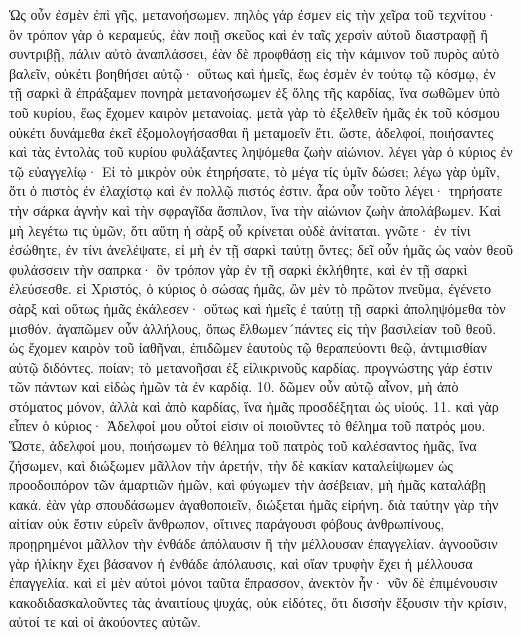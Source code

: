 Ὡς οὖν ἐσμὲν ἐπὶ γῆς, μετανοήσωμεν. πηλὸς γάρ ἐσμεν εἰς τὴν χεῖρα τοῦ τεχνίτου· ὃν τρόπον γὰρ ὁ κεραμεύς, ἐὰν ποιῇ σκεῦος καὶ ἐν ταῖς χερσὶν αὐτοῦ διαστραφῇ ἢ συντριβῇ, πάλιν αὐτὸ ἀναπλάσσει, ἐὰν δὲ προφθάσῃ εἰς τὴν κάμινον τοῦ πυρὸς αὐτὸ βαλεῖν, οὐκέτι βοηθήσει αὐτῷ· οὕτως καὶ ἡμεῖς, ἕως ἐσμὲν ἐν τούτῳ τῷ κόσμῳ, ἐν τῇ σαρκὶ ἃ ἐπράξαμεν πονηρὰ μετανοήσωμεν ἐξ ὅλης τῆς καρδίας, ἵνα σωθῶμεν ὑπὸ τοῦ κυρίου, ἕως ἔχομεν καιρὸν μετανοίας. μετὰ γὰρ τὸ ἐξελθεῖν ἡμᾶς ἐκ τοῦ κόσμου οὐκέτι δυνάμεθα ἐκεῖ ἐξομολογήσασθαι ἢ μεταμοεῖν ἔτι. ὥστε, ἀδελφοί, ποιήσαντες καὶ τὰς ἐντολὰς τοῦ κυρίου φυλάξαντες ληψόμεθα ζωὴν αἰώνιον. λέγει γὰρ ὁ κύριος ἐν τῷ εὐαγγελίῳ· Εἰ τὸ μικρὸν οὐκ ἐτηρήσατε, τὸ μέγα τίς ὑμῖν δώσει; λέγω γὰρ ὑμῖν, ὅτι ὁ πιστὸς ἐν ἐλαχίστῳ καὶ ἐν πολλῷ πιστός ἐστιν. ἆρα οὖν τοῦτο λέγει· τηρήσατε τὴν σάρκα ἁγνὴν καὶ τὴν σφραγῖδα ἄσπιλον, ἵνα τὴν αἰώνιον ζωὴν ἀπολάβωμεν.
Καὶ μὴ λεγέτω τις ὑμῶν, ὅτι αὕτη ἡ σὰρξ οὖ κρίνεται οὐδὲ ἀνίταται. γνῶτε· ἐν τίνι ἐσώθητε, ἐν τίνι ἀνελέψατε, εἰ μὴ ἐν τῇ σαρκὶ ταύτῃ ὄντες; δεῖ οὖν ἡμᾶς ὡς ναὸν θεοῦ φυλάσσειν τὴν σαπρκα· ὃν τρόπον γὰρ ἐν τῇ σαρκὶ ἐκλήθητε, καὶ ἐν τῇ σαρκὶ ἐλεύσεσθε. εἰ Χριστός, ὁ κύριος ὁ σώσας ἡμᾶς, ὢν μὲν τὸ πρῶτον πνεῦμα, ἐγένετο σὰρξ καὶ οὕτως ἡμᾶς ἐκάλεσεν· οὕτως καὶ ἡμεῖς ἐ ταύτῃ τῇ σαρκὶ ἀποληψόμεθα τὸν μισθόν. ἀγαπῶμεν οὖν ἀλλήλους, ὅπως ἔλθωμεν´πάντες εἰς τὴν βασιλείαν τοῦ θεοῦ. ὡς ἔχομεν καιρὸν τοῦ ἰαθῆναι, ἐπιδῶμεν ἑαυτοὺς τῷ θεραπεύοντι θεῷ, ἀντιμισθίαν αὐτῷ διδόντες. ποίαν; τὸ μετανοῆσαι ἐξ εἰλικρινοῦς καρδίας. προγνώστης γάρ ἐστιν τῶν πάντων καὶ εἰδὼς ἡμῶν τὰ ἐν καρδίᾳ. 10. δῶμεν οὖν αὐτῷ αἶνον, μὴ ἀπὸ στόματος μόνον, ἀλλὰ καὶ ἀπὸ καρδίας, ἵνα ἡμᾶς προσδέξηται ὡς υἱούς. 11. καὶ γὰρ εἶπεν ὁ κύριος· Ἀδελφοί μου οὗτοί εἰσιν οἱ ποιοῦντες τὸ θέλημα τοῦ πατρός μου.
Ὥστε, ἀδελφοί μου, ποιήσωμεν τὸ θέλημα τοῦ πατρὸς τοῦ καλέσαντος ἡμᾶς, ἵνα ζήσωμεν, καὶ διώξωμεν μᾶλλον τὴν ἀρετήν, τὴν δὲ κακίαν καταλείψωμεν ὡς προοδοιπόρον τῶν ἁμαρτιῶν ἡμῶν, καὶ φύγωμεν τὴν ἀσέβειαν, μὴ ἡμᾶς καταλάβῃ κακά. ἐὰν γὰρ σπουδάσωμεν ἀγαθοποιεῖν, διώξεται ἡμᾶς εἰρήνη. διὰ ταύτην γὰρ τὴν αἰτίαν οὐκ ἔστιν εὑρεῖν ἄνθρωπον, οἵτινες παράγουσι φόβους ἀνθρωπίνους, προῃρημένοι μᾶλλον τὴν ἐνθάδε ἀπόλαυσιν ἢ τὴν μέλλουσαν ἐπαγγελίαν. ἀγνοοῦσιν γὰρ ἡλίκην ἔχει βάσανον ἡ ἐνθάδε ἀπόλαυσις, καὶ οἵαν τρυφὴν ἔχει ἡ μέλλουσα ἐπαγγελία. καὶ εἰ μὲν αὐτοὶ μόνοι ταῦτα ἔπρασσον, ἀνεκτὸν ἦν· νῦν δὲ ἐπιμένουσιν κακοδιδασκαλοῦντες τὰς ἀναιτίους ψυχάς, οὐκ εἰδότες, ὅτι δισσὴν ἕξουσιν τὴν κρίσιν, αὐτοί τε καὶ οἱ ἀκούοντες αὐτῶν.
